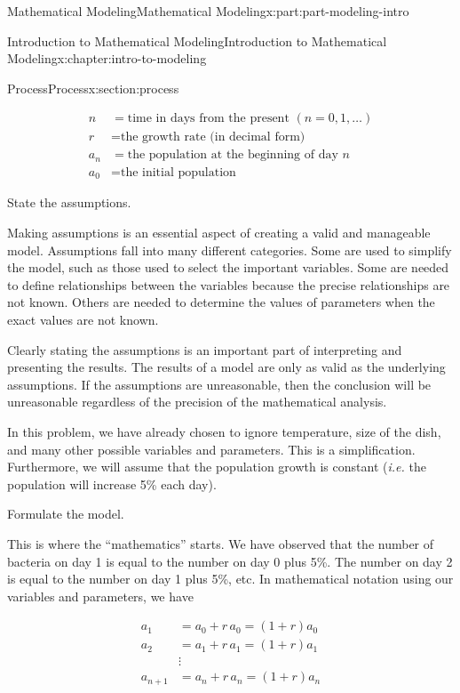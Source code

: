 \documentclass[oneside,10pt,]{book}
\numberwithin{equation}{section}
\begin{document}
\begin{partptx}{Mathematical Modeling}{}{Mathematical Modeling}{}{}{x:part:part-modeling-intro}
\begin{chapterptx}{Introduction to Mathematical Modeling}{}{Introduction to Mathematical Modeling}{}{}{x:chapter:intro-to-modeling}
\begin{sectionptx}{Process}{}{Process}{}{}{x:section:process}
\begin{description}
\par
%
\begin{equation*}
\begin{aligned}
n & = \text{time in days from the present }(n = 0, 1,\dots) \\
r & = \text{the growth rate (in decimal form)} \\
a_n & = \text{the population at the beginning of day }n \\
a_0 & = \text{the initial population}
\end{aligned}
\end{equation*}
%
\item[{Step 4:}]State the assumptions.%
\par
Making assumptions is an essential aspect of creating a valid and manageable model. Assumptions fall into many different categories. Some are used to simplify the model, such as those used to select the important variables. Some are needed to define relationships between the variables because the precise relationships are not known. Others are needed to determine the values of parameters when the exact values are not known.%
\par
Clearly stating the assumptions is an important part of interpreting and presenting the results. The results of a model are only as valid as the underlying assumptions. If the assumptions are unreasonable, then the conclusion will be unreasonable regardless of the precision of the mathematical analysis.%
\par
In this problem, we have already chosen to ignore temperature, size of the dish, and many other possible variables and parameters. This is a simplification. Furthermore, we will assume that the population growth is constant (\emph{i.e.} the population will increase 5\% each day).%
\item[{Step 5:}]Formulate the model.%
\par
This is where the “mathematics” starts. We have observed that the number of bacteria on day 1 is equal to the number on day 0 plus 5\%. The number on day 2 is equal to the number on day 1 plus 5\%, etc. In mathematical notation using our variables and parameters, we have%
\par
%
\begin{equation*}
\begin{aligned}
a_1 & = a_0 + r\,a_0 = (1+r)a_0 \\
a_2 & = a_1 + r\,a_1 = (1+r)a_1 \\
& \vdots \\
a_{n+1} & = a_n + r\,a_n = (1+r)a_n

\end{aligned}
\end{equation*}
\end{description}
\end{sectionptx}
\end{chapterptx}
\end{partptx}
\end{document}
